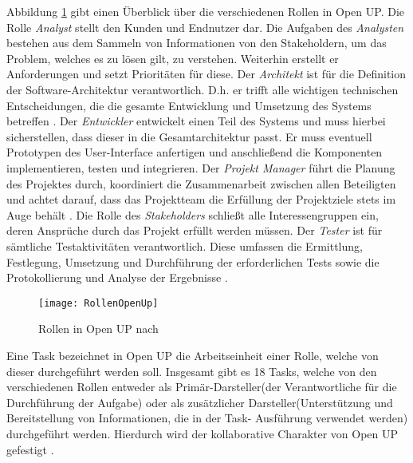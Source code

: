 Abbildung \ref{fig:RollenOpenUp} gibt einen Überblick über die verschiedenen Rollen in Open UP. Die Rolle \textit{Analyst} stellt den Kunden und Endnutzer dar. Die Aufgaben des \textit{Analysten} bestehen aus dem Sammeln von Informationen von den Stakeholdern, um das Problem, welches es zu lösen gilt, zu verstehen. Weiterhin erstellt er Anforderungen und setzt Prioritäten für diese.\newline
Der \textit{Architekt} ist für die Definition der Software-Architektur verantwortlich. D.h. er trifft alle wichtigen technischen Entscheidungen, die die gesamte Entwicklung und Umsetzung des Systems betreffen \cite{OpenUPProcess}.\newline
Der \textit{Entwickler} entwickelt einen Teil des Systems und muss hierbei sicherstellen, dass dieser in die Gesamtarchitektur passt. Er muss eventuell Prototypen des User-Interface anfertigen und anschließend die Komponenten implementieren, testen und integrieren.\newline
Der \textit{Projekt Manager} führt die Planung des Projektes durch, koordiniert die Zusammenarbeit zwischen allen Beteiligten und achtet darauf, dass das Projektteam die Erfüllung der Projektziele stets im Auge behält \cite{OpenUPProcess}.\newline
Die Rolle des \textit{Stakeholders} schließt alle Interessengruppen ein, deren Ansprüche durch das Projekt erfüllt werden müssen. \newline
Der \textit{Tester} ist für sämtliche Testaktivitäten verantwortlich. Diese umfassen die Ermittlung, Festlegung, Umsetzung und Durchführung der erforderlichen Tests sowie die Protokollierung und Analyse der Ergebnisse \cite{OpenUPProcess}.
\begin{figure}[htp]
\begin{center}
  \texttt{[image: RollenOpenUp]} %
  \caption{Rollen in Open UP nach \cite{openup}}
  \label{fig:RollenOpenUp}
\end{center}
\end{figure}

Eine Task bezeichnet in Open UP die Arbeitseinheit einer Rolle, welche von dieser durchgeführt werden soll. Insgesamt gibt es 18 Tasks, welche von den verschiedenen Rollen entweder als Primär-Darsteller(der Verantwortliche für die Durchführung der Aufgabe) oder als zusätzlicher Darsteller(Unterstützung und Bereitstellung von Informationen, die in der Task- Ausführung verwendet werden) durchgeführt werden. Hierdurch wird der kollaborative Charakter von Open UP gefestigt \cite{eclipseopenup}.

